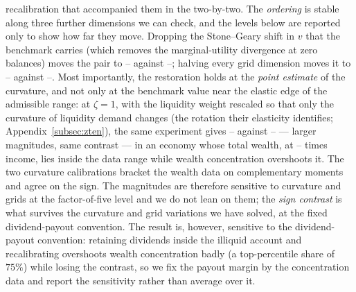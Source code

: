 \documentclass[12pt]{article}
\providecommand{\pendingnum}{\textit{--}}
\providecommand{\OwnKVDlnPLSb}{\pendingnum}\providecommand{\OwnKVDlnPLevyb}{\pendingnum}
\providecommand{\OwnKVDlnPLSf}{\pendingnum}
\providecommand{\OwnKVDlnPLevyf}{\pendingnum}
\providecommand{\ZtenLS}{\pendingnum}\providecommand{\ZtenLevy}{\pendingnum}
\providecommand{\ZtenW}{\pendingnum}\providecommand{\ZtenTopOne}{\pendingnum}
\begin{document}
recalibration that accompanied them in the two-by-two. The \emph{ordering}
is stable along three further dimensions we can check, and the levels below
are reported only to show how far they move. Dropping the Stone--Geary shift
in $v$ that the benchmark carries (which removes the marginal-utility
divergence at zero balances) moves the pair to $\OwnKVDlnPLSb$ against
$\OwnKVDlnPLevyb$; halving every grid dimension moves it to
$\OwnKVDlnPLSf$ against $\OwnKVDlnPLevyf$. Most importantly, the
restoration holds at the \citeauthor{krishnamurthy2012} \emph{point estimate} of the
curvature, and not only at the benchmark value near the elastic edge of the
admissible range: at $\zeta = 1$,
with the liquidity weight rescaled so that only the curvature of liquidity
demand changes (the rotation their elasticity identifies;
Appendix~\ref{subsec:zten}), the same experiment gives $\ZtenLS$ against
$\ZtenLevy$ --- larger magnitudes, same contrast --- in an economy whose
total wealth, at $\ZtenW$ times income, lies inside the data range while
wealth concentration overshoots it. The two curvature calibrations
bracket the wealth data on complementary moments and agree on the sign.
The magnitudes are
therefore sensitive to curvature and grids at the factor-of-five level and
we do not lean on
them; the \emph{sign contrast} is what survives the curvature and grid variations we have solved, at the fixed dividend-payout convention. The result is, however,
sensitive to the dividend-payout convention: retaining dividends inside
the illiquid account and recalibrating overshoots wealth concentration
badly (a top-percentile share of $75\%$) while losing the contrast, so we
fix the payout margin by the concentration data and report the
sensitivity rather than average over it.
\end{document}
